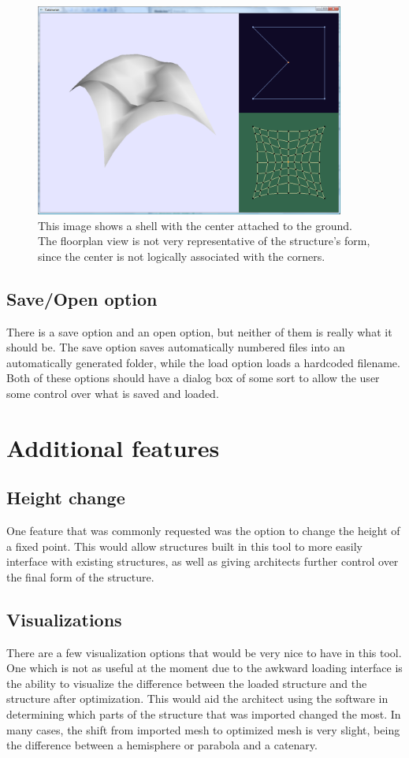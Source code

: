\documentclass{thesis}
\begin{document}
\begin{figure}
\centering
\includegraphics[width=4in]{images/center_fixed.png}
\caption[A shell with the center fixed]{This image shows a shell with the center attached to the ground.  The floorplan view is
not very representative of the structure's form, since the center is not logically associated with the corners.}
\label{fig:compound_catenary}
\end{figure}

\subsection{Save/Open option}
There is a save option and an open option, but neither of them is really what it should be.  The save option saves automatically
numbered files into an automatically generated folder, while the load option loads a hardcoded filename.  Both of these options
should have a dialog box of some sort to allow the user some control over what is saved and loaded.

\section{Additional features}

\subsection{Height change}
One feature that was commonly requested was the option to change the height of a fixed point.  This would allow structures built
in this tool to more easily interface with existing structures, as well as giving architects further control over the final form
of the structure.

\subsection{Visualizations}
There are a few visualization options that would be very nice to have in this tool.  One which is not as useful at the moment due
to the awkward loading interface is the ability to visualize the difference between the loaded structure and the structure after
optimization.  This would aid the architect using the software in determining which parts of the structure that was imported
changed the most.  In many cases, the shift from imported mesh to optimized mesh is very slight, being the difference between
a hemisphere or parabola and a catenary.
\end{document}
